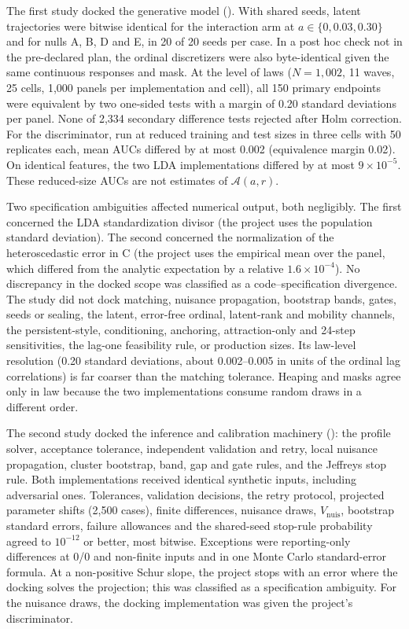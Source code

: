 The first study docked the generative model (). With shared seeds, latent trajectories were bitwise identical for the interaction arm at $a\in\{0,0.03,0.30\}$ and for nulls A, B, D and E, in 20 of 20 seeds per case. In a post hoc check not in the pre-declared plan, the ordinal discretizers were also byte-identical given the same continuous responses and mask. At the level of laws ($N=1{,}002$, 11 waves, 25 cells, 1,000 panels per implementation and cell), all 150 primary endpoints were equivalent by two one-sided tests with a margin of 0.20 standard deviations per panel. None of 2,334 secondary difference tests rejected after Holm correction. For the discriminator, run at reduced training and test sizes in three cells with 50 replicates each, mean AUCs differed by at most 0.002 (equivalence margin 0.02). On identical features, the two LDA implementations differed by at most $9\times10^{-5}$. These reduced-size AUCs are not estimates of $\mathcal A(a,r)$.

Two specification ambiguities affected numerical output, both negligibly. The first concerned the LDA standardization divisor (the project uses the population standard deviation). The second concerned the normalization of the heteroscedastic error in C (the project uses the empirical mean over the panel, which differed from the analytic expectation by a relative $1.6\times10^{-4}$). No discrepancy in the docked scope was classified as a code--specification divergence. The study did not dock matching, nuisance propagation, bootstrap bands, gates, seeds or sealing, the latent, error-free ordinal, latent-rank and mobility channels, the persistent-style, conditioning, anchoring, attraction-only and 24-step sensitivities, the lag-one feasibility rule, or production sizes. Its law-level resolution (0.20 standard deviations, about 0.002--0.005 in units of the ordinal lag correlations) is far coarser than the matching tolerance. Heaping and masks agree only in law because the two implementations consume random draws in a different order.

The second study docked the inference and calibration machinery (): the profile solver, acceptance tolerance, independent validation and retry, local nuisance propagation, cluster bootstrap, band, gap and gate rules, and the Jeffreys stop rule. Both implementations received identical synthetic inputs, including adversarial ones. Tolerances, validation decisions, the retry protocol, projected parameter shifts (2,500 cases), finite differences, nuisance draws, $V_{\mathrm{nuis}}$, bootstrap standard errors, failure allowances and the shared-seed stop-rule probability agreed to $10^{-12}$ or better, most bitwise. Exceptions were reporting-only differences at 0/0 and non-finite inputs and in one Monte Carlo standard-error formula. At a non-positive Schur slope, the project stops with an error where the docking solves the projection; this was classified as a specification ambiguity. For the nuisance draws, the docking implementation was given the project's discriminator.

